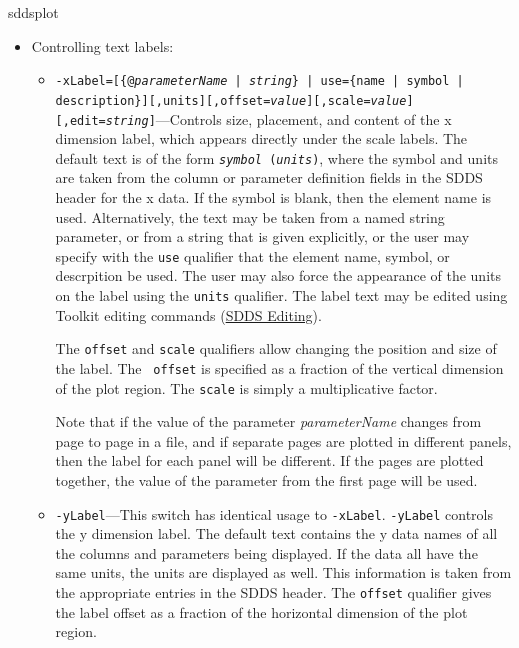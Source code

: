 \begin{sddsprog}{sddsplot}
\begin{itemize}
\begin{itemize}
  \item {\tt -grid[=x][,y]}---This option is superseeded by the {\tt -tickSettings} option.  It permits specification
that grids (rather than ticks) will be used for major divisions.

  \item {\tt -noScales}---Specifies that no scales (i.e., no ticks, subticks, or numeric labels) will be plotted.

  \item {\tt -noBorder}---Specifies that no border will be made around the plot region.  Implies {\tt -noScales}.

  \end{itemize}
\item Controlling text labels:
  \begin{itemize}

  \item {\tt -xLabel=[\{@{\em parameterName} | {\em string}\} | use=\{name | symbol |
description\}][,units][,offset={\em value}][,scale={\em value}][,edit={\em string}]}---Controls size,
placement, and content of the x dimension label, which appears directly under the scale labels.  The
default text is of the form {\tt {\em symbol} ({\em units})}, where the symbol and units are taken from
the column or parameter definition fields in the SDDS header for the x data.  If the symbol is blank, then
the element name is used.  Alternatively, the text may be taken from a named string parameter, or from a
string that is given explicitly, or the user may specify with the {\tt use} qualifier that the
element name, symbol, or descrpition be used.  The user may also force the appearance of the units on the
label using the {\tt units} qualifier.   The label text may be edited using Toolkit editing commands
(\hyperref[SDDSediting]{SDDS Editing}).

The {\tt offset} and {\tt scale} qualifiers allow changing the position and size of the label.  The {\tt
offset} is specified as a fraction of the vertical dimension of the plot region.  The {\tt scale} is
simply a multiplicative factor.

Note that if the value of the parameter {\em parameterName} changes from page to page in a file, and if separate pages are
plotted in different panels, then the label for each panel will be different.  If the pages are plotted together, the value
of the parameter from the first page will be used.

  \item {\tt -yLabel}---This switch has identical usage to {\tt -xLabel}.  {\tt -yLabel} controls the y dimension label.  The
default text contains the y data names of all the columns and parameters being displayed.  If the data all have the same
units, the units are displayed as well.  This information is taken from the appropriate entries in the SDDS header.
The {\tt offset} qualifier gives the label offset as a fraction of the horizontal dimension of the plot region.


\end{itemize}
\end{itemize}
\end{sddsprog}
